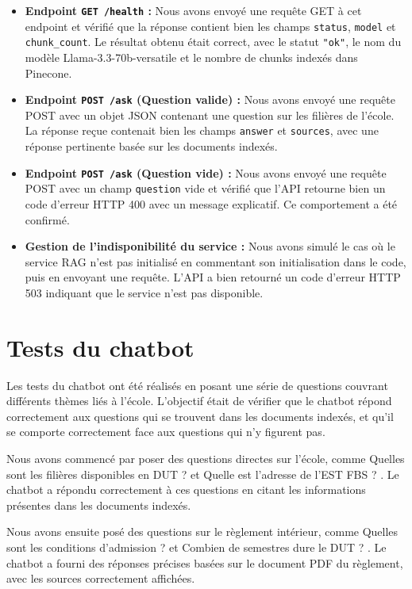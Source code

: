 \documentclass[12pt, a4paper, twoside]{report}
\begin{document}
\begin{itemize}[label=\bullet]
    \item \textbf{Endpoint \texttt{GET /health} :} Nous avons envoyé une requête GET à cet endpoint et vérifié que la réponse contient bien les champs \texttt{status}, \texttt{model} et \texttt{chunk\_count}. Le résultat obtenu était correct, avec le statut \texttt{"ok"}, le nom du modèle Llama-3.3-70b-versatile et le nombre de chunks indexés dans Pinecone.
    \item \textbf{Endpoint \texttt{POST /ask} (Question valide) :} Nous avons envoyé une requête POST avec un objet JSON contenant une question sur les filières de l'école. La réponse reçue contenait bien les champs \texttt{answer} et \texttt{sources}, avec une réponse pertinente basée sur les documents indexés.
    \item \textbf{Endpoint \texttt{POST /ask} (Question vide) :} Nous avons envoyé une requête POST avec un champ \texttt{question} vide et vérifié que l'API retourne bien un code d'erreur HTTP 400 avec un message explicatif. Ce comportement a été confirmé.
    \item \textbf{Gestion de l'indisponibilité du service :} Nous avons simulé le cas où le service RAG n'est pas initialisé en commentant son initialisation dans le code, puis en envoyant une requête. L'API a bien retourné un code d'erreur HTTP 503 indiquant que le service n'est pas disponible.
\end{itemize}

\section{Tests du chatbot}
Les tests du chatbot ont été réalisés en posant une série de questions couvrant différents thèmes liés à l'école. L'objectif était de vérifier que le chatbot répond correctement aux questions qui se trouvent dans les documents indexés, et qu'il se comporte correctement face aux questions qui n'y figurent pas.

Nous avons commencé par poser des questions directes sur l'école, comme \og Quelles sont les filières disponibles en DUT ? \fg et \og Quelle est l'adresse de l'EST FBS ? \fg. Le chatbot a répondu correctement à ces questions en citant les informations présentes dans les documents indexés.

Nous avons ensuite posé des questions sur le règlement intérieur, comme \og Quelles sont les conditions d'admission ? \fg et \og Combien de semestres dure le DUT ? \fg. Le chatbot a fourni des réponses précises basées sur le document PDF du règlement, avec les sources correctement affichées.
\end{document}
